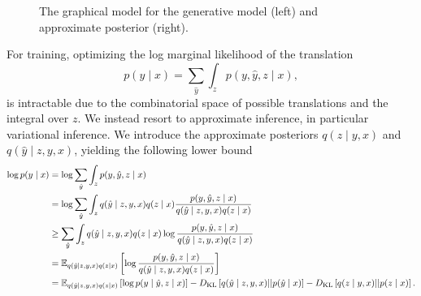 \documentclass[11pt]{article}
\begin{document}
\begin{figure}
\centering
\begin{subfigure}{0.48\textwidth}
\centering
{}
\end{subfigure}
\hfill
\begin{subfigure}{0.48\textwidth}
\centering
{}
\end{subfigure}

\caption{
\label{fig:gen-model}
The graphical model for the generative model (left)
and approximate posterior (right).
}
\end{figure}

For training, optimizing the log marginal likelihood of the translation
$$p(y \mid x) = \sum_{\hat{y}}\int_z p(y,\hat{y}, z \mid x),$$
is intractable due to the combinatorial space of possible translations and
the integral over $z$.
We instead resort to approximate inference, in particular variational inference.
We introduce the approximate posteriors $q(z \mid y, x)$ and $q(\hat{y} \mid z, y, x)$,
yielding the following lower bound
$$
\begin{aligned}
\log p(y \mid x) &= \log \sum_{\hat{y}}\int_z p(y,\hat{y}, z \mid x)\\
&= \log \sum_{\hat{y}}\int_z
    q(\hat{y} \mid z, y, x)q(z \mid x)
    \frac{p(y,\hat{y}, z \mid x)}{q(\hat{y} \mid z, y, x)q(z \mid x)}\\
&\ge \sum_{\hat{y}}\int_z
    q(\hat{y} \mid z, y, x)q(z \mid x)
    \log \frac{p(y,\hat{y}, z \mid x)}{q(\hat{y} \mid z, y, x)q(z \mid x)}\\
&= \mathbb{E}_{q(\hat{y} \mid z, y, x)q(z \mid x)}\left[\log \frac{p(y,\hat{y}, z \mid x)}{q(\hat{y} \mid z, y, x)q(z \mid x)}\right]\\
&= \mathbb{E}_{q(\hat{y} \mid z, y, x)q(z \mid x)}\left[\log p(y\mid \hat{y}, z \mid x)\right]
-D_\mathrm{KL}\left[q(\hat{y} \mid z, y, x) || p(\hat{y} \mid x)\right]
-D_\mathrm{KL}\left[q(z \mid y, x) || p(z \mid x)\right].
\end{aligned}
$$
\end{document}
